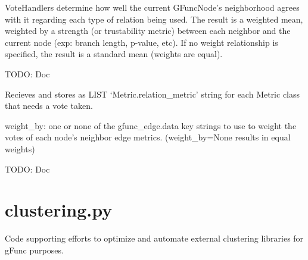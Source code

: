 \documentclass[letterpaper,10pt,english]{sphinxmanual}
\begin{document}
\begin{fulllineitems}
\label{code:gfunc.analysis_classes.VoteHandler}
VoteHandlers determine how well the current GFuncNode's
neighborhood agrees with it regarding each type of relation
being used.  The result is a weighted mean, weighted by
a strength (or trustability metric) between each neighbor
and the current node (exp: branch length, p-value, etc).
If no weight relationship is specified, the result is a
standard mean (weights are equal).

\begin{fulllineitems}
\label{code:gfunc.analysis_classes.VoteHandler.__init__}
TODO: Doc

\end{fulllineitems}


\begin{fulllineitems}
\label{code:gfunc.analysis_classes.VoteHandler.set_vote_types}
Recieves and stores as LIST `Metric.relation\_metric' string for
each Metric class that needs a vote taken.

weight\_by: one or none of the gfunc\_edge.data key strings to use to weight
the votes of each node's neighbor edge metrics.
(weight\_by=None results in equal weights)

\end{fulllineitems}


\begin{fulllineitems}
\label{code:gfunc.analysis_classes.VoteHandler.take_votes}
TODO: Doc

\end{fulllineitems}


\end{fulllineitems}

\label{code:module-gfunc.clustering}

\section{clustering.py}
\label{code:clustering-py}
Code supporting efforts to optimize and automate external clustering libraries for gFunc purposes.
\end{document}

